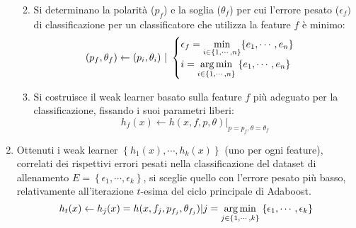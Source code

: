 \begin{enumerate}
\begin{enumerate}
\begin{enumerate}
                    \end{enumerate}

                    \item Si determinano la polarità ($p_f$) e la soglia ($\theta_f$) per cui l'errore pesato ($\epsilon_f)$ di classificazione per un classificatore che utilizza la feature $f$ è minimo:
                    \begin{equation}
                        \label{subeq:minimum_error_polarity_and_threshold}
                        (p_f, \theta_f) \leftarrow (p_i, \theta_i) 
                        \text{ } | \text{ } 
                        \begin{cases}
                            \epsilon_f = \underset{i \in \{1, \cdots, n\}}\min{\left\{ e_1, \cdots, e_n \right\}} & \\
                            i = \underset{i \in \{1, \cdots, n\}}{\operatorname{arg}\operatorname{min}}\;{\left\{ e_1, \cdots, e_n \right\}}
                        \end{cases}
                    \end{equation}

                    \item Si costruisce il weak learner basato sulla feature $f$ più adeguato per la classificazione, fissando i suoi parametri liberi:
                    \begin{equation}
                        \label{subeq:weak_learner_specifications}
                        h_f(x) \leftarrow h(x, f, p, \theta)|_{p = p_f, \theta = \theta_f}
                    \end{equation}
                \end{enumerate}

                \item Ottenuti i weak learner $\left\{h_1(x), \cdots, h_k(x)\right\}$ (uno per ogni feature), correlati dei rispettivi errori pesati nella classificazione del dataset di allenamento $E = \left \{ \epsilon_1, \cdots, \epsilon_k \right \}$, si sceglie quello con l'errore pesato più basso, relativamente all'iterazione $t$-esima del ciclo principale di Adaboost.
                \begin{equation}
                    \label{subeq:best_weak_learner}
                    h_t(x) \leftarrow h_j(x) = h(x, f_j, p_{f_j}, \theta_{f_j})| j = \underset{j \in \{1, \cdots, k\}}{\operatorname{arg}\operatorname{min}}\;{\{\epsilon_1, \cdots, \epsilon_k\}}
                \end{equation}

            \end{enumerate}

